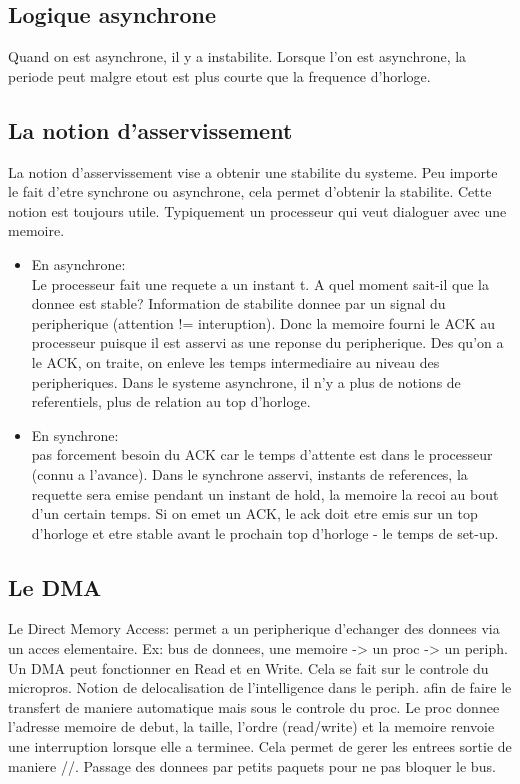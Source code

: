     \subsection{Logique asynchrone} %
    \label{sub:Logique asynchrone}
	Quand on est asynchrone, il y a instabilite.
	Lorsque l'on est asynchrone, la periode peut malgre etout est plus
	courte que la frequence d'horloge.

    \subsection{La notion d'asservissement} %
    \label{sub:La notion d'asservissement}
	La notion d'asservissement vise a obtenir une stabilite du systeme.
	Peu importe le fait d'etre synchrone ou asynchrone, cela permet
	d'obtenir la stabilite.
	Cette notion est toujours utile.
	Typiquement un processeur qui veut dialoguer avec une memoire.
	\begin{itemize}
	    \item En asynchrone:\\
	    Le processeur fait une requete a un instant t.
	    A quel moment sait-il que la donnee est stable? Information de
	    stabilite donnee par un signal du peripherique (attention !=
	    interuption). Donc la memoire fourni le ACK au processeur puisque
	    il est asservi as une reponse du peripherique.
	    Des qu'on a le ACK, on traite, on enleve les temps intermediaire
	    au niveau des peripheriques.
	    Dans le systeme asynchrone, il n'y a plus de notions de
	    referentiels, plus de relation au top d'horloge.
	    \item En synchrone:\\
	    pas forcement besoin du ACK car le temps d'attente est dans le
	    processeur (connu a l'avance).
	    Dans le synchrone asservi, instants de references, la requette
	    sera emise pendant un instant de hold, la memoire la recoi au bout
	    d'un certain temps. Si on emet un ACK, le ack doit etre emis sur
	    un top d'horloge et etre stable avant le prochain top d'horloge -
	    le temps de set-up.
	\end{itemize}

    \subsection{Le DMA} %
    \label{sub:Le DMA}
	Le Direct Memory Access: permet a un peripherique d'echanger des
	donnees via un acces elementaire. Ex: bus de donnees, une memoire ->
	un proc -> un periph.
	Un DMA peut fonctionner en Read et en Write. Cela se fait sur le
	controle du micropros. Notion de delocalisation de l'intelligence dans
	le periph. afin de faire le transfert de maniere automatique mais sous
	le controle du proc. Le proc donnee l'adresse memoire de debut, la
	taille, l'ordre (read/write) et la memoire renvoie une interruption
	lorsque elle a terminee. Cela permet de gerer les entrees sortie de
	maniere //. Passage des donnees par petits paquets pour ne pas bloquer
	le bus.


